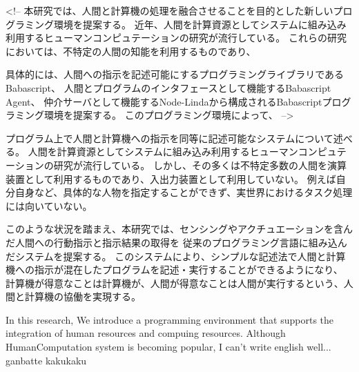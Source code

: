 \begin{jabstract}
<!-- 
本研究では、人間と計算機の処理を融合させることを目的とした新しいプログラミング環境を提案する。
近年、人間を計算資源としてシステムに組み込み利用するヒューマンコンピュテーションの研究が流行している。
これらの研究においては、不特定の人間の知能を利用するものであり、

具体的には、人間への指示を記述可能にするプログラミングライブラリであるBabascript、
人間とプログラムのインタフェースとして機能するBabascript Agent、
仲介サーバとして機能するNode-Lindaから構成されるBabascriptプログラミング環境を提案する。
このプログラミング環境によって、 -->

プログラム上で人間と計算機への指示を同等に記述可能なシステムについて述べる。
人間を計算資源としてシステムに組み込み利用するヒューマンコンピュテーションの研究が流行している。
しかし、その多くは不特定多数の人間を演算装置として利用するものであり、入出力装置として利用していない。
例えば自分自身など、具体的な人物を指定することができず、実世界におけるタスク処理には向いていない。

このような状況を踏まえ、本研究では、センシングやアクチュエーションを含んだ人間への行動指示と指示結果の取得を
従来のプログラミング言語に組み込んだシステムを提案する。
このシステムにより、シンプルな記述法で人間と計算機への指示が混在したプログラムを記述・実行することができるようになり、
計算機が得意なことは計算機が、人間が得意なことは人間が実行するという、人間と計算機の協働を実現する。

\end{jabstract}

\begin{eabstract}

In this research, We introduce a programming environment that supports the integration of human resources and compuing resources.
Although HumanComputation system is becoming popular,
I can't write english well...
ganbatte kakukaku

\end{eabstract}
